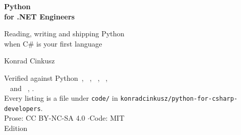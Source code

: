 \thispagestyle{empty}
\begin{center}
\vspace*{3.0cm}

{\Huge\bfseries\color{mblue} Python\\[6pt] for .NET Engineers}

\vspace{1.0cm}
{\Large\color{mgrey} Reading, writing and shipping Python\\[4pt]
when C\# is your first language}

\vspace{2.4cm}
{\large Konrad Cinkusz}

\vfill
{\small\color{mgrey}
Verified against Python~\pypatch, ~\uvver, ~\pydanticver,
~\fastapiver,\\ ~\sqlalchemyver{} and
~\pytestver, \pinnedon.\\[4pt]
Every listing is a file under \texttt{code/} in
\texttt{konradcinkusz/python-for-csharp-developers}.\\[10pt]
Prose: CC BY-NC-SA 4.0 \quad$\cdot$\quad Code: MIT\\[4pt]
Edition \bookedition}

\vspace{1.2cm}
\end{center}
\clearpage
